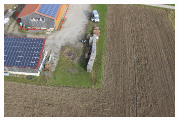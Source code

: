 \documentclass[remotesensing,article,accept,moreauthors,pdftex,10pt,a4paper]{mdpi}
\theoremstyle{mdpi}
\newcounter{ex}
\newcounter{re}
\begin{document}
\begin{figure}[H]
\begin{subfigure}[tbp]{0.31\columnwidth}
           \includegraphics[width=\textwidth]{optimize/IMG_0951_osm_ori.png}
           \caption[]{}%
           {{\small }}   
           \label{fig:5c}
       \end{subfigure}
       

\end{figure}
\end{document}
